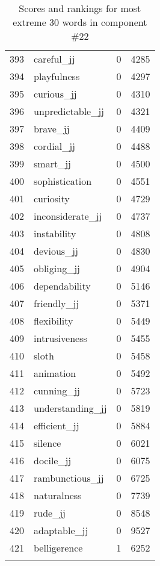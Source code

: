 \begin{longtable}[!htbp]{| rlr@{.}l |}
    393 & careful\_jj & 0 & 4285 \\
    394 & playfulness & 0 & 4297 \\
    395 & curious\_jj & 0 & 4310 \\
    396 & unpredictable\_jj & 0 & 4321 \\
    397 & brave\_jj & 0 & 4409 \\
    398 & cordial\_jj & 0 & 4488 \\
    399 & smart\_jj & 0 & 4500 \\
    400 & sophistication & 0 & 4551 \\
    401 & curiosity & 0 & 4729 \\
    402 & inconsiderate\_jj & 0 & 4737 \\
    403 & instability & 0 & 4808 \\
    404 & devious\_jj & 0 & 4830 \\
    405 & obliging\_jj & 0 & 4904 \\
    406 & dependability & 0 & 5146 \\
    407 & friendly\_jj & 0 & 5371 \\
    408 & flexibility & 0 & 5449 \\
    409 & intrusiveness & 0 & 5455 \\
    410 & sloth & 0 & 5458 \\
    411 & animation & 0 & 5492 \\
    412 & cunning\_jj & 0 & 5723 \\
    413 & understanding\_jj & 0 & 5819 \\
    414 & efficient\_jj & 0 & 5884 \\
    415 & silence & 0 & 6021 \\
    416 & docile\_jj & 0 & 6075 \\
    417 & rambunctious\_jj & 0 & 6725 \\
    418 & naturalness & 0 & 7739 \\
    419 & rude\_jj & 0 & 8548 \\
    420 & adaptable\_jj & 0 & 9527 \\
    421 & belligerence & 1 & 6252 \\
    \hline
    \caption{Scores and rankings for most extreme 30 words in component \#22} \\
\end{longtable}
